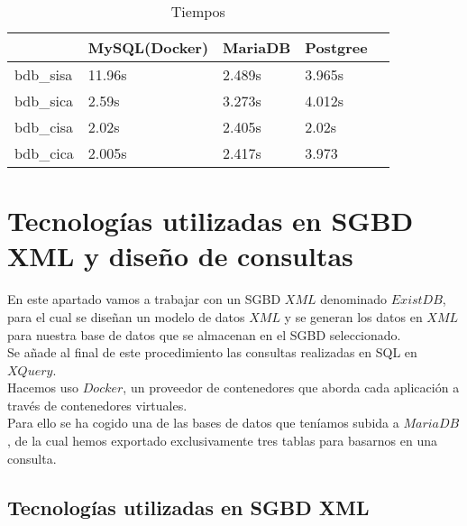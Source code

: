 \documentclass[12pt,a4paper]{article}
\begin{document}
\begin{table}[!h]
\centering
\caption{Tiempos}
\label{tiempos}
\begin{tabular}{|l|l|l|l|l}
\hline
 & MySQL(Docker) & MariaDB  & Postgree   \\ \hline
 bdb\_sisa & 11.96s & 2.489s  &  3.965s   \\ 
 bdb\_sica & 2.59s &  3.273s &  4.012s   \\ 
 bdb\_cisa & 2.02s  & 2.405s   & 2.02s   \\ 
 bdb\_cica & 2.005s & 2.417s &  3.973   
\end{tabular}
\end{table}




\vspace{5em}





\newpage
\section{Tecnologías utilizadas en SGBD XML y diseño de consultas} \label{pto4} 

En este apartado vamos a trabajar con un SGBD $XML$ denominado $ExistDB$, para el cual se diseñan un modelo de datos $XML$ y se generan los datos en $XML$ para nuestra base de datos que se almacenan en el SGBD seleccionado. \\

Se añade al final de este procedimiento las consultas realizadas en SQL en $XQuery$.\\

Hacemos uso $Docker$, un proveedor de contenedores que aborda cada aplicación a través de contenedores virtuales.\\

Para ello se ha cogido una de las bases de datos que teníamos subida a $MariaDB$ , de la cual hemos exportado exclusivamente tres tablas para basarnos en una consulta. 

\subsection{Tecnologías utilizadas en SGBD XML}  \label{pto41}
\end{document}
